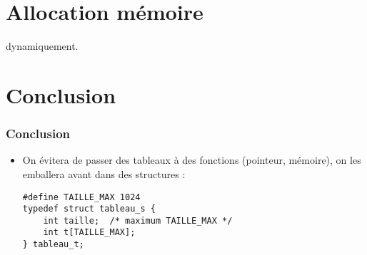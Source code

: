 \documentclass[xcolor=pdftex,svgnames,table]{beamer}
\begin{document}
\section{Allocation mémoire}
dynamiquement.




\section{Conclusion}
\begin{frame}[fragile]
  \frametitle{Conclusion}
  \begin{itemize}
\item On évitera de passer des tableaux à des fonctions (pointeur, mémoire), on les
  emballera avant dans des structures :
  \begin{lstlisting}
#define TAILLE_MAX 1024
typedef struct tableau_s {
    int taille;  /* maximum TAILLE_MAX */
    int t[TAILLE_MAX];
} tableau_t;
  \end{lstlisting}
  \end{itemize}
\end{frame}
\end{document}
